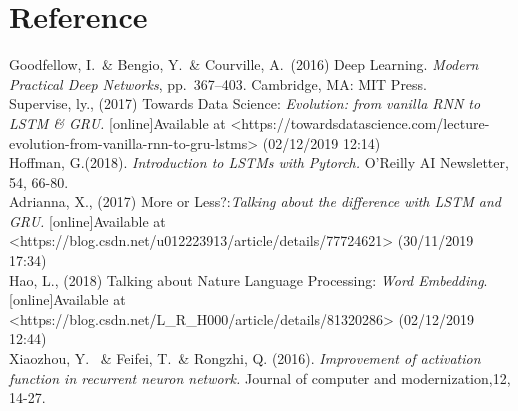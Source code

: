 \documentclass{article}
\begin{document}
\section*{Reference}
\small

\noindent [1] Goodfellow, I.\ \& Bengio, Y.\ \& Courville, A.\ (2016) Deep Learning. {\it Modern Practical Deep Networks},
pp.\ 367--403. Cambridge, MA: MIT Press.\\

\noindent[2] Supervise, ly., (2017) Towards Data Science:
{\it Evolution: from vanilla RNN to LSTM \& GRU.} [online]Available at <https://towardsdatascience.com/lecture-evolution-from-vanilla-rnn-to-gru-lstms> (02/12/2019 12:14)\\

\noindent[3] Hoffman, G.(2018). {\it Introduction to LSTMs with Pytorch.} O'Reilly AI Newsletter, 54, 66-80.\\

\noindent[4] Adrianna, X., (2017) More or Less?:{\it Talking about the difference with LSTM and GRU.}
[online]Available at <https://blog.csdn.net/u012223913/article/details/77724621> (30/11/2019 17:34)\\

\noindent[5]  Hao, L., (2018) Talking about Nature Language Processing: {\it
Word Embedding}. [online]Available at <https://blog.csdn.net/L\_R\_H000/article/details/81320286> (02/12/2019 12:44)\\

\noindent[6]  Xiaozhou, Y. \ \& Feifei, T.\ \& Rongzhi, Q. (2016). {\it Improvement of activation function in recurrent neuron network.} Journal of computer and modernization,12, 14-27.\\
\end{document}
